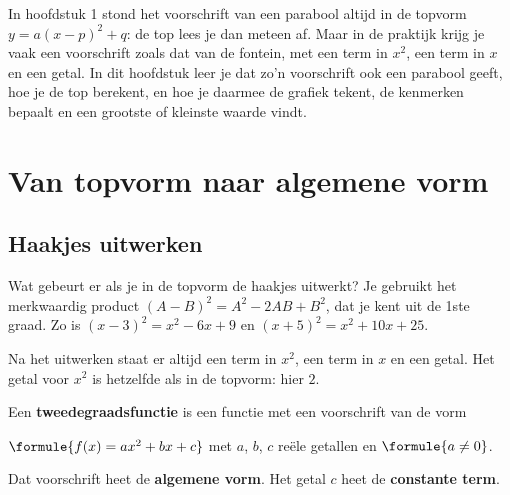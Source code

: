 In hoofdstuk 1 stond het voorschrift van een parabool altijd in de topvorm $y = a(x - p)^2 + q$: de top lees je dan meteen af. Maar in de praktijk krijg je vaak een voorschrift zoals dat van de fontein, met een term in $x^2$, een term in $x$ en een getal. In dit hoofdstuk leer je dat zo'n voorschrift ook een parabool geeft, hoe je de top berekent, en hoe je daarmee de grafiek tekent, de kenmerken bepaalt en een grootste of kleinste waarde vindt.

\begin{oefeningen}[Start]

\end{oefeningen}

\section{Van topvorm naar algemene vorm}

\subsection{Haakjes uitwerken}

Wat gebeurt er als je in de topvorm de haakjes uitwerkt? Je gebruikt het merkwaardig product $(A - B)^2 = A^2 - 2AB + B^2$, dat je kent uit de 1ste graad. Zo is $(x - 3)^2 = x^2 - 6x + 9$ en $(x + 5)^2 = x^2 + 10x + 25$.


Na het uitwerken staat er altijd een term in $x^2$, een term in $x$ en een getal. Het getal voor $x^2$ is hetzelfde als in de topvorm: hier $2$.

\begin{theorie}
Een \textbf{\textcolor{accent}{tweedegraadsfunctie}} is een functie met een voorschrift van de vorm

\qquad $\formule{f(x) = ax^2 + bx + c}$ \qquad met $a$, $b$, $c$ reële getallen en $\formule{a \neq 0}$.

Dat voorschrift heet de \textbf{\textcolor{accent}{algemene vorm}}. Het getal $c$ heet de \textbf{\textcolor{accent}{constante term}}.
\end{theorie}


